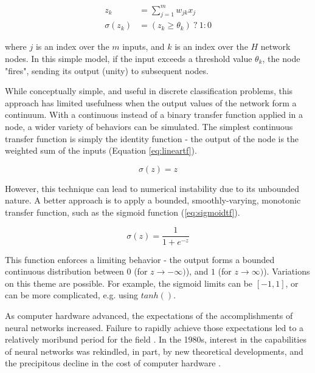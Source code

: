 \documentclass{article}
\begin{document}
\begin{equation}
\begin{split}
  z_k &= \sum_{j=1}^m w_{jk} x_j \\
  \sigma(z_k) &= (z_k \ge \theta_k)\ ?\ 1:0
\end{split}
\label{eq:threshholdtf}
\end{equation}

\noindent where $j$ is an index over the $m$ inputs, and $k$ is an index over the $H$ network nodes. In this simple model, if the input exceeds a threshold value $\theta_k$, the node "fires", sending its output (unity) to subsequent nodes.

While conceptually simple, and useful in discrete classification problems, this approach has limited usefulness when the output values of the network form a continuum. With a continuous instead of a binary transfer function applied in a node, a wider variety of behaviors can be simulated. The simplest continuous transfer function is simply the identity function - the output of the node is the weighted sum of the inputs (Equation \ref{eq:lineartf}).

\begin{equation}
  \sigma(z) = z
  \label{eq:lineartf}
\end{equation}

\noindent However, this technique can lead to numerical instability due to its unbounded nature. A better approach is to apply a bounded, smoothly-varying, monotonic transfer function, such as the sigmoid function (\ref{eq:sigmoidtf}).

\begin{equation}
  \sigma(z) = \frac {1} {1 + e^{-z}}
  \label{eq:sigmoidtf}
\end{equation}

\noindent This function enforces a limiting behavior - the output forms a bounded continuous distribution between $0$ (for $z \rightarrow -\infty)$), and $1$ (for  $z \rightarrow \infty)$). Variations on this theme are possible. For example, the sigmoid limits can be $[-1,1]$, or can be more complicated, e.g. using $tanh()$.

As computer hardware advanced, the expectations of the accomplishments of neural networks increased. Failure to rapidly achieve those expectations led to a relatively moribund period for the field \cite{Minsky1969}. In the 1980s, interest in the capabilities of neural networks was rekindled, in part, by new theoretical developments, and the precipitous decline in the cost of computer hardware \cite{Allman1990}.
\end{document}
